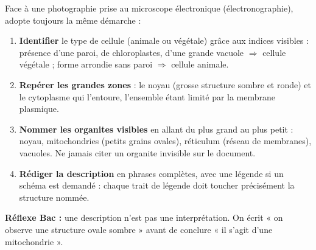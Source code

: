 \documentclass[11pt]{article}
\begin{document}
\begin{methode}
Face à une photographie prise au microscope électronique (électronographie), adopte toujours la même démarche :
\begin{enumerate}
\item \textbf{Identifier} le type de cellule (animale ou végétale) grâce aux indices visibles : présence d'une paroi, de chloroplastes, d'une grande vacuole $\Rightarrow$ cellule végétale ; forme arrondie sans paroi $\Rightarrow$ cellule animale.
\item \textbf{Repérer les grandes zones} : le noyau (grosse structure sombre et ronde) et le cytoplasme qui l'entoure, l'ensemble étant limité par la membrane plasmique.
\item \textbf{Nommer les organites visibles} en allant du plus grand au plus petit : noyau, mitochondries (petits grains ovales), réticulum (réseau de membranes), vacuoles. Ne jamais citer un organite invisible sur le document.
\item \textbf{Rédiger la description} en phrases complètes, avec une légende si un schéma est demandé : chaque trait de légende doit toucher précisément la structure nommée.
\end{enumerate}
\textbf{Réflexe Bac :} une description n'est pas une interprétation. On écrit « on observe une structure ovale sombre » avant de conclure « il s'agit d'une mitochondrie ».
\end{methode}
\end{document}
